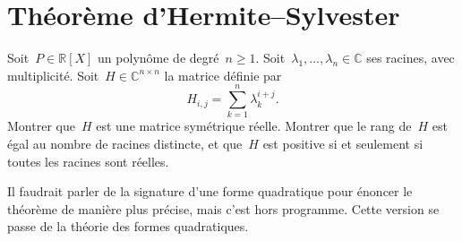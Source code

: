 
\section{Théorème d'Hermite--Sylvester}


Soit~$P \in \mathbb{R}[X]$ un polynôme de degré~$n \geq 1$. Soit~$\lambda_1,\dotsc,\lambda_n \in \mathbb{C}$ ses racines, avec multiplicité.
Soit~$H \in \mathbb{C}^{n\times n}$ la matrice définie par
\[ H_{i,j} = \sum_{k=1}^n \lambda_k^{i+j}. \]
Montrer que~$H$ est une matrice symétrique réelle.
Montrer que le rang de~$H$ est égal au nombre de racines distincte, et que~$H$ est positive si et seulement si toutes les racines sont réelles.

\begin{em}
  Il faudrait parler de la signature d'une forme quadratique pour énoncer le
  théorème de manière plus précise, mais c'est hors programme.
  Cette version se passe de la théorie des formes quadratiques.
\end{em}

